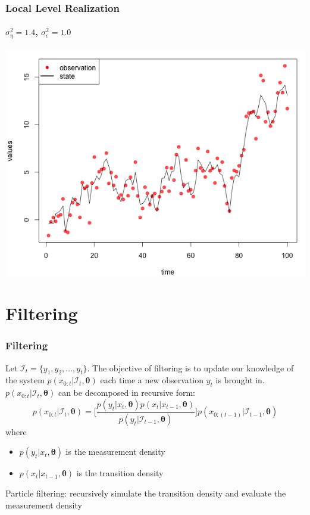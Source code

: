 \documentclass[11pt]{beamer}
\begin{document}
\begin{frame}
\frametitle{Local Level Realization}
\framesubtitle{$\sigma_{\eta}^2=1.4$, $\sigma_{\epsilon}^2=1.0$}
\centering
\includegraphics[scale=0.45]{ullm-realization}
\end{frame}

\section{Filtering}

\begin{frame}
\frametitle{Filtering}
Let $\mathcal{I}_t = \{y_1, y_2, \ldots, y_t\}$. The objective of filtering is to update our knowledge of the system $p(x_{0:t} | \mathcal{I}_t,\boldsymbol{\theta})$ each time a new observation $y_t$ is brought in. $p(x_{0:t} | \mathcal{I}_t,\boldsymbol{\theta})$ can be decomposed in recursive form:
$$
p(x_{0:t} | \mathcal{I}_t,\boldsymbol{\theta}) = \Big[ \frac{p(y_t | x_t,\boldsymbol{\theta}) p(x_t | x_{t-1},\boldsymbol{\theta})}{p(y_t | \mathcal{I}_{t-1},\boldsymbol{\theta})} \Big] p(x_{0:(t-1)} | \mathcal{I}_{t-1},\boldsymbol{\theta}) 
$$
where
\begin{itemize}
\item $p(y_t | x_t,\boldsymbol{\theta})$ is the measurement density
\item $p(x_t | x_{t-1},\boldsymbol{\theta})$ is the transition density
\end{itemize}
\bigskip
\alert{Particle filtering}: recursively simulate the transition density and evaluate the measurement density 
\end{frame}
\end{document}
